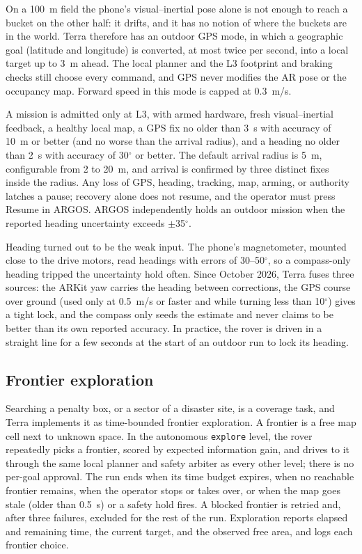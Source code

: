 On a 100~m field the phone's visual--inertial pose alone is not enough to reach a bucket on the other half: it drifts, and it has no notion of where the buckets are in the world.
Terra therefore has an outdoor GPS mode, in which a geographic goal (latitude and longitude) is converted, at most twice per second, into a local target up to 3~m ahead.
The local planner and the L3 footprint and braking checks still choose every command, and GPS never modifies the AR pose or the occupancy map.
Forward speed in this mode is capped at 0.3~m/s.

A mission is admitted only at L3, with armed hardware, fresh visual--inertial feedback, a healthy local map, a GPS fix no older than 3~s with accuracy of 10~m or better (and no worse than the arrival radius), and a heading no older than 2~s with accuracy of 30$^\circ$ or better.
The default arrival radius is 5~m, configurable from 2 to 20~m, and arrival is confirmed by three distinct fixes inside the radius.
Any loss of GPS, heading, tracking, map, arming, or authority latches a pause; recovery alone does not resume, and the operator must press Resume in ARGOS.
ARGOS independently holds an outdoor mission when the reported heading uncertainty exceeds $\pm$35$^\circ$.

Heading turned out to be the weak input.
The phone's magnetometer, mounted close to the drive motors, read headings with errors of 30--50$^\circ$, so a compass-only heading tripped the uncertainty hold often.
Since October 2026, Terra fuses three sources: the ARKit yaw carries the heading between corrections, the GPS course over ground (used only at 0.5~m/s or faster and while turning less than 10$^\circ$) gives a tight lock, and the compass only seeds the estimate and never claims to be better than its own reported accuracy.
In practice, the rover is driven in a straight line for a few seconds at the start of an outdoor run to lock its heading.

\subsection{Frontier exploration}
\label{sec:env-explore}

Searching a penalty box, or a sector of a disaster site, is a coverage task, and Terra implements it as time-bounded frontier exploration.
A frontier is a free map cell next to unknown space.
In the autonomous \texttt{explore} level, the rover repeatedly picks a frontier, scored by expected information gain, and drives to it through the same local planner and safety arbiter as every other level; there is no per-goal approval.
The run ends when its time budget expires, when no reachable frontier remains, when the operator stops or takes over, or when the map goes stale (older than 0.5~s) or a safety hold fires.
A blocked frontier is retried and, after three failures, excluded for the rest of the run.
Exploration reports elapsed and remaining time, the current target, and the observed free area, and logs each frontier choice.

